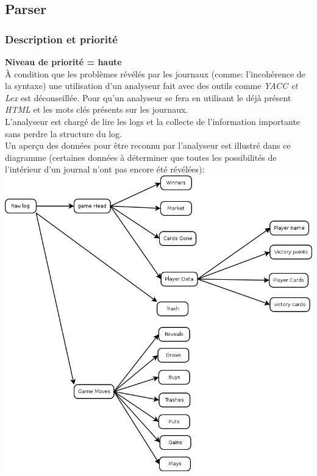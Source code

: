 \documentclass{scrreprt}
\begin{document}
\subsection{Parser}

\subsubsection{Description et priorité}
\textbf{Niveau de priorité = haute}\\
À condition que les problèmes révélés par les journaux (comme: l'incohérence de la syntaxe) une utilisation d'un analyseur fait avec des outils comme \textit{YACC et Lex} est déconseillée.
Pour qu'un analyseur se fera en utilisant le déjà présent \textit{HTML} et les mots clés présents sur les journaux.\\
L'analyseur est chargé de lire les logs et la collecte de l'information importante sans perdre la structure du log.\\
Un aperçu des données pour être reconnu par l'analyseur est illustré dans ce diagramme (certaines données à déterminer que toutes les possibilités de l'intérieur d'un journal n’ont pas encore été révélées):\\
\includegraphics[scale=0.35,keepaspectratio]{UseCaseParser}
\end{document}
